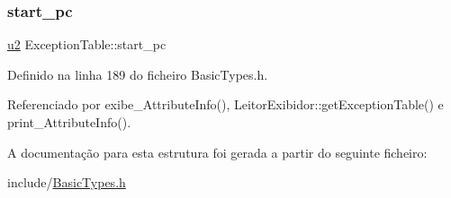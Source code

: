\subsubsection{\texorpdfstring{start\+\_\+pc}{start\_pc}}
{\footnotesize\ttfamily \hyperlink{BasicTypes_8h_a732cde1300aafb73b0ea6c2558a7a54f}{u2} Exception\+Table\+::start\+\_\+pc}



Definido na linha 189 do ficheiro Basic\+Types.\+h.



Referenciado por exibe\+\_\+\+Attribute\+Info(), Leitor\+Exibidor\+::get\+Exception\+Table() e print\+\_\+\+Attribute\+Info().



A documentação para esta estrutura foi gerada a partir do seguinte ficheiro\+:\begin{DoxyCompactItemize}
\item 
include/\hyperlink{BasicTypes_8h}{Basic\+Types.\+h}\end{DoxyCompactItemize}
